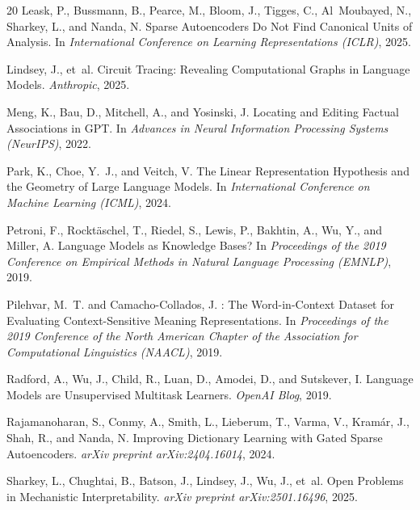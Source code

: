 \documentclass{article}
\begin{document}
\begin{thebibliography}{20}
Leask, P., Bussmann, B., Pearce, M., Bloom, J., Tigges, C., Al~Moubayed, N., Sharkey, L., and Nanda, N.
\newblock Sparse Autoencoders Do Not Find Canonical Units of Analysis.
\newblock In \emph{International Conference on Learning Representations (ICLR)}, 2025.

Lindsey, J., et~al.
\newblock Circuit Tracing: Revealing Computational Graphs in Language Models.
\newblock \emph{Anthropic}, 2025.

Meng, K., Bau, D., Mitchell, A., and Yosinski, J.
\newblock Locating and Editing Factual Associations in {GPT}.
\newblock In \emph{Advances in Neural Information Processing Systems (NeurIPS)}, 2022.

Park, K., Choe, Y.~J., and Veitch, V.
\newblock The Linear Representation Hypothesis and the Geometry of Large Language Models.
\newblock In \emph{International Conference on Machine Learning (ICML)}, 2024.

Petroni, F., Rockt\"{a}schel, T., Riedel, S., Lewis, P., Bakhtin, A., Wu, Y., and Miller, A.
\newblock Language Models as Knowledge Bases?
\newblock In \emph{Proceedings of the 2019 Conference on Empirical Methods in Natural Language Processing (EMNLP)}, 2019.

Pilehvar, M.~T. and Camacho-Collados, J.
: The Word-in-Context Dataset for Evaluating Context-Sensitive Meaning Representations.
\newblock In \emph{Proceedings of the 2019 Conference of the North American Chapter of the Association for Computational Linguistics (NAACL)}, 2019.

Radford, A., Wu, J., Child, R., Luan, D., Amodei, D., and Sutskever, I.
\newblock Language Models are Unsupervised Multitask Learners.
\newblock \emph{OpenAI Blog}, 2019.

Rajamanoharan, S., Conmy, A., Smith, L., Lieberum, T., Varma, V., Kram\'{a}r, J., Shah, R., and Nanda, N.
\newblock Improving Dictionary Learning with Gated Sparse Autoencoders.
\newblock \emph{arXiv preprint arXiv:2404.16014}, 2024.

Sharkey, L., Chughtai, B., Batson, J., Lindsey, J., Wu, J., et~al.
\newblock Open Problems in Mechanistic Interpretability.
\newblock \emph{arXiv preprint arXiv:2501.16496}, 2025.


\end{thebibliography}
\end{document}

